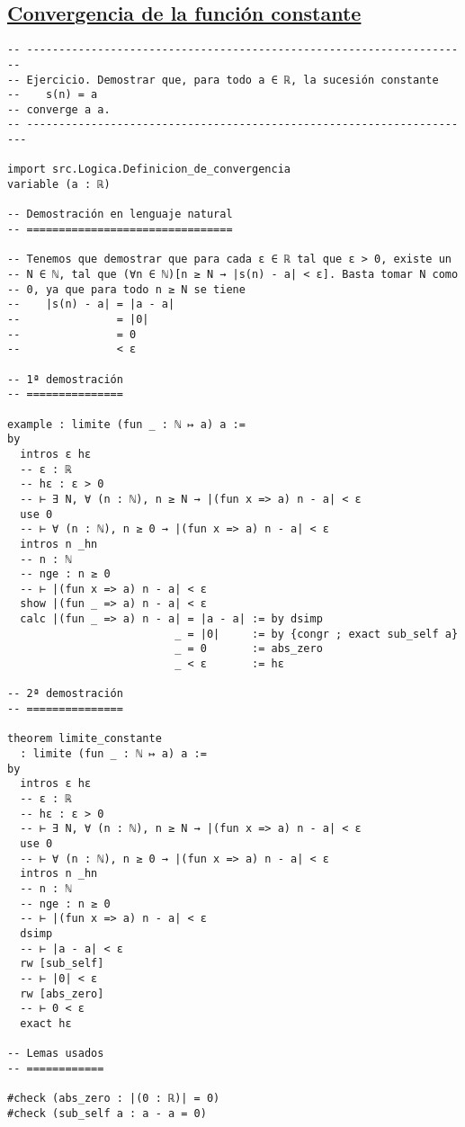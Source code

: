 \subsection{\href{./src/Logica/Convergencia\_de\_la\_funcion\_constante.lean}{Convergencia de la función constante}}
\label{sec:orgef5b767}
\begin{verbatim}
-- ---------------------------------------------------------------------
-- Ejercicio. Demostrar que, para todo a ∈ ℝ, la sucesión constante
--    s(n) = a
-- converge a a.
-- ----------------------------------------------------------------------

import src.Logica.Definicion_de_convergencia
variable (a : ℝ)

-- Demostración en lenguaje natural
-- ================================

-- Tenemos que demostrar que para cada ε ∈ ℝ tal que ε > 0, existe un
-- N ∈ ℕ, tal que (∀n ∈ ℕ)[n ≥ N → |s(n) - a| < ε]. Basta tomar N como
-- 0, ya que para todo n ≥ N se tiene
--    |s(n) - a| = |a - a|
--               = |0|
--               = 0
--               < ε

-- 1ª demostración
-- ===============

example : limite (fun _ : ℕ ↦ a) a :=
by
  intros ε hε
  -- ε : ℝ
  -- hε : ε > 0
  -- ⊢ ∃ N, ∀ (n : ℕ), n ≥ N → |(fun x => a) n - a| < ε
  use 0
  -- ⊢ ∀ (n : ℕ), n ≥ 0 → |(fun x => a) n - a| < ε
  intros n _hn
  -- n : ℕ
  -- nge : n ≥ 0
  -- ⊢ |(fun x => a) n - a| < ε
  show |(fun _ => a) n - a| < ε
  calc |(fun _ => a) n - a| = |a - a| := by dsimp
                          _ = |0|     := by {congr ; exact sub_self a}
                          _ = 0       := abs_zero
                          _ < ε       := hε

-- 2ª demostración
-- ===============

theorem limite_constante
  : limite (fun _ : ℕ ↦ a) a :=
by
  intros ε hε
  -- ε : ℝ
  -- hε : ε > 0
  -- ⊢ ∃ N, ∀ (n : ℕ), n ≥ N → |(fun x => a) n - a| < ε
  use 0
  -- ⊢ ∀ (n : ℕ), n ≥ 0 → |(fun x => a) n - a| < ε
  intros n _hn
  -- n : ℕ
  -- nge : n ≥ 0
  -- ⊢ |(fun x => a) n - a| < ε
  dsimp
  -- ⊢ |a - a| < ε
  rw [sub_self]
  -- ⊢ |0| < ε
  rw [abs_zero]
  -- ⊢ 0 < ε
  exact hε

-- Lemas usados
-- ============

#check (abs_zero : |(0 : ℝ)| = 0)
#check (sub_self a : a - a = 0)
\end{verbatim}

